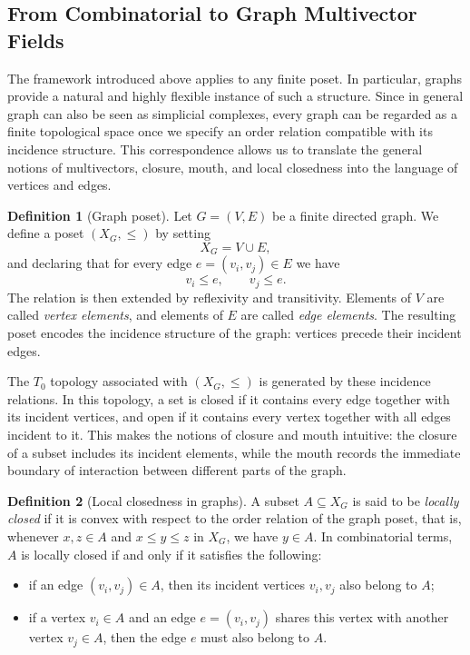 \documentclass{article}
\theoremstyle{definition}
\newtheorem{definition}{Definition}
\theoremstyle{plain}
\theoremstyle{remark}
\newcommand{\1}{\mathbbm{1}}  %
\begin{document}
\subsection{From Combinatorial to Graph Multivector Fields}

The framework introduced above applies to any finite poset.  In
particular, graphs provide a natural and highly flexible instance of
such a structure.  Since in general graph can also be seen as simplicial complexes, every graph can be regarded as a finite topological
space once we specify an order relation compatible with its incidence
structure.  This correspondence allows us to translate the general
notions of multivectors, closure, mouth, and local closedness into the
language of vertices and edges.

\begin{definition}[Graph poset]
Let $G=(V,E)$ be a finite directed graph.  We define a poset
$(X_G,\leq)$ by setting
\[
X_G = V\cup E,
\]
and declaring that for every edge $e=(v_i,v_j)\in E$ we have
\[
v_i \leq e, \qquad v_j \leq e.
\]
The relation is then extended by reflexivity and transitivity.
Elements of $V$ are called \emph{vertex elements}, and elements of $E$
are called \emph{edge elements}.  The resulting poset encodes the
incidence structure of the graph: vertices precede their incident
edges.
\end{definition}

The $T_0$ topology associated with $(X_G,\leq)$ is generated by these
incidence relations.  In this topology, a set is closed if it contains
every edge together with its incident vertices, and open if it contains
every vertex together with all edges incident to it.  This makes the
notions of closure and mouth intuitive: the closure of a subset includes
its incident elements, while the mouth records the immediate boundary of
interaction between different parts of the graph.

\begin{definition}[Local closedness in graphs]
A subset $A\subseteq X_G$ is said to be \emph{locally closed} if it is
convex with respect to the order relation of the graph poset, that is,
whenever $x,z\in A$ and $x\leq y\leq z$ in $X_G$, we have $y\in A$.  In
combinatorial terms, $A$ is locally closed if and only if it satisfies
the following:
\begin{itemize}
    \item if an edge $(v_i,v_j)\in A$, then its incident vertices
    $v_i,v_j$ also belong to $A$;
    \item if a vertex $v_i\in A$ and an edge $e=(v_i,v_j)$ shares this
    vertex with another vertex $v_j\in A$, then the edge $e$ must also
    belong to $A$.
\end{itemize}
\end{definition}
\end{document}
